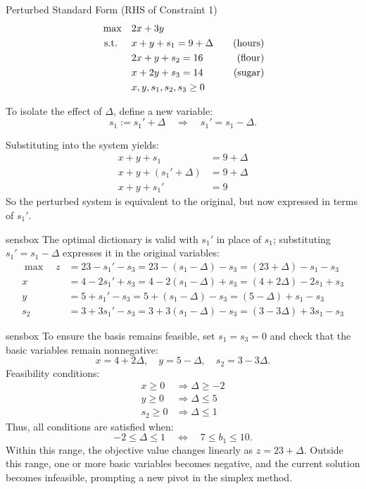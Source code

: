 \begin{sensdisplay}{Perturbed Standard Form (RHS of Constraint 1)}
\[
\begin{aligned}
\max \quad & 2x + 3y \\
\mbox{ s.t. } \quad
& x + y + s_1 = 9 + \Delta \quad & \mbox{(hours)} \\
& 2x + y + s_2 = 16 \quad & \mbox{(flour)} \\
& x + 2y + s_3 = 14 \quad & \mbox{(sugar)} \\
& x, y, s_1, s_2, s_3 \geq 0
\end{aligned}
\]

To isolate the effect of \( \Delta \), define a new variable:
\[
s_1 := s_1' + \Delta \quad \Rightarrow \quad s_1' = s_1 - \Delta.
\]

Substituting into the system yields:
\[
\begin{aligned}
x + y + s_1 &= 9 + \Delta \\
x + y + (s_1' + \Delta) &= 9 + \Delta \\
x + y + s_1' &= 9
\end{aligned}
\]
So the perturbed system is equivalent to the original, but now expressed in terms of \( s_1' \).
\end{sensdisplay}

\begin{steppanel}{sensbox}
The optimal dictionary is valid with \( s_1' \) in place of \( s_1 \); substituting \( s_1' = s_1 - \Delta \) expresses it in the original variables:
\[
\begin{aligned}
\max \quad
z &= 23 - s_1' - s_3 = 23 - (s_1 - \Delta) - s_3 = (23 + \Delta) - s_1 - s_3 \\
x &= 4 - 2s_1' + s_3 = 4 - 2(s_1 - \Delta) + s_3 = (4 + 2\Delta) - 2s_1 + s_3 \\
y &= 5 + s_1' - s_3 = 5 + (s_1 - \Delta) - s_3 = (5 - \Delta) + s_1 - s_3 \\
s_2 &= 3 + 3s_1' - s_3 = 3 + 3(s_1 - \Delta) - s_3 = (3 - 3\Delta) + 3s_1 - s_3
\end{aligned}
\]
\end{steppanel}

\begin{steppanel}{sensbox}
To ensure the basis remains feasible, set \( s_1 = s_3 = 0 \) and check that the basic variables remain nonnegative:
\[
x = 4 + 2\Delta, \quad
y = 5 - \Delta, \quad
s_2 = 3 - 3\Delta.
\]
Feasibility conditions:
\[
\begin{aligned}
x \geq 0 &\Rightarrow \Delta \geq -2 \\
y \geq 0 &\Rightarrow \Delta \leq 5 \\
s_2 \geq 0 &\Rightarrow \Delta \leq 1
\end{aligned}
\]
Thus, all conditions are satisfied when:
\[
\boxed{-2 \leq \Delta \leq 1}
\quad\Longleftrightarrow\quad
7 \leq b_1 \leq 10.
\]
Within this range, the objective value changes linearly as \( z = 23 + \Delta \). Outside this range, one or more basic variables becomes negative, and the current solution becomes infeasible, prompting a new pivot in the simplex method.
\end{steppanel}

